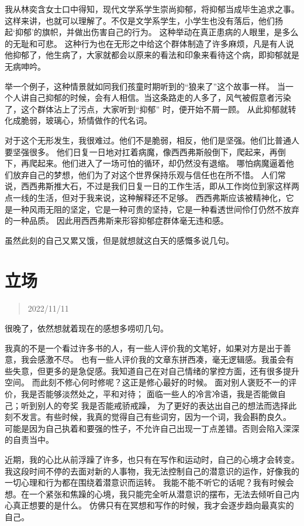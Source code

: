 \documentclass[cn,12pt]{elegantbook}
\begin{document}
我从林奕含女士口中得知，现代文学系学生崇尚抑郁，将抑郁当成毕生追求之事。
这样来讲，也就可以理解了。不仅是文学系学生，小学生也没有落后，他们扬起‘抑郁’的旗帜，并做出伤害自己的行为。
这种举动在真正患病的人眼里，是多么的无耻和可悲。
这种行为也在无形之中给这个群体制造了许多麻烦，凡是有人说他抑郁了，他生病了，大家就都会以原来的看法和印象来看待这个病，即抑郁就是无病呻吟。

举一个例子，这种情景就如同我们孩童时期听到的“狼来了”这个故事一样。
当一个人讲自己抑郁的时候，会有人相信。当这条路走的人多了，风气被假意者污染了，这个群体沾上了污点，大家听到“抑郁” 时，便开始不屑一顾。
从此抑郁就转化成脆弱，玻璃心，矫情做作的代名词。

对于这个无形发生，我很难过。他们不是脆弱，相反，他们是坚强。他们比普通人要坚强很多。
他们日复一日地对扛着病魔，像西西弗斯般倒下，爬起来，再倒下，再爬起来。他们进入了一场可怕的循环，却仍然没有退缩。
哪怕病魔逼着他们放弃自己的梦想，他们为了对这个世界保持乐观与信任也在所不惜。
人们常说，西西弗斯推大石，不过是我们日复一日的工作生活，即从工作岗位到家这样两点一线的生活，但对于我来说，这种解释还不足够。
西西弗斯应该被精神化，它是一种风雨无阻的坚定，它是一种可贵的坚持，它是一种看透世间伶仃仍然不放弃的一种品质。
因此用西西弗斯来形容抑郁症群体毫无违和感。

虽然此刻的自己又累又饿，但是就想就这白天的感慨多说几句。

\newpage
\section{立场}
\begin{quotation}
  2022/11/11
\end{quotation}

很晚了，依然想就着现在的感想多唠叨几句。

我真的不是一个看过许多书的人，有一些人评价我的文笔好，如果对方是出于善意，我会感激不尽。
也有一些人评价我的文章东拼西凑，毫无逻辑感。我虽会有些失意，但更多的是急促感。我知道自己在对自己情绪的掌控方面，还有很多提升空间。
而此刻不修心何时修呢？这正是修心最好的时候。
面对别人褒贬不一的评价，我是否能够淡然处之，平和对待；
面临一些人的冷言冷语，我是否能做自己；听到别人的夸奖 我是否能戒骄戒躁，
为了更好的表达出自己的想法而选择此刻不发言。有些时候，我真的觉得自己有些词穷，因为一个词，我会斟酌良久。
可能是因为自己执着和要强的性子，不允许自己出现一丁点差错。否则会陷入深深的自责当中。

近期，我的心比从前浮躁了许多，也只有在写作和运动时，自己的心境才会转变。
我这段时间不停的去面对新的人事物，我无法控制自己的潜意识的运作，好像我的一切心理和行为都在围绕着潜意识而运转。
我能不能不听它的话呢？我有时候会想。在一个紧张和焦躁的心境，我只能完全听从潜意识的摆布，无法去倾听自己内心真正想要的是什么。
仿佛只有在冥想和写作的时候，我才会逐步趋向最真实的自己。
\end{document}
